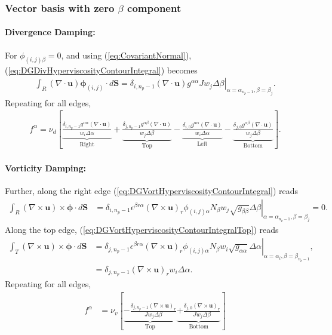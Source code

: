 \documentclass{article}
\newcommand{\vb}{\mathbf}
\newcommand{\vg}{\boldsymbol}
\begin{document}
\subsubsection{Vector basis with zero $\beta$ component}

\paragraph{Divergence Damping:}  For $\phi_{(i,j)\beta} = 0$, and using (\ref{eq:CovariantNormal}), (\ref{eq:DGDivHyperviscosityContourIntegral}) becomes
\begin{align}
\int_R (\nabla \cdot \vb{u}) \vg{\phi}_{(i,j)} \cdot d\vb{S} = \delta_{i,n_p-1} \left. (\nabla \cdot \vb{u}) g^{\alpha \alpha} J w_j \Delta \beta \right\vert_{\alpha = \alpha_{n_p-1}, \beta = \beta_j}.
\end{align}  Repeating for all edges,
\begin{align}
f^\alpha = \nu_d \left[ \underbrace{\frac{\delta_{i,n_p-1} g^{\alpha \alpha} (\nabla \cdot \vb{u})}{w_i \Delta \alpha}}_{\mbox{Right}} + \underbrace{\frac{\delta_{j,n_p-1} g^{\alpha \beta} (\nabla \cdot \vb{u})}{w_j \Delta \beta}}_{\mbox{Top}} - \underbrace{\frac{\delta_{i,0} g^{\alpha \alpha} (\nabla \cdot \vb{u})}{w_i \Delta \alpha}}_{\mbox{Left}} - \underbrace{\frac{\delta_{j,0} g^{\alpha \beta} (\nabla \cdot \vb{u})}{w_j \Delta \beta}}_{\mbox{Bottom}} \right].
\end{align}

\paragraph{Vorticity Damping:}  Further, along the right edge (\ref{eq:DGVortHyperviscosityContourIntegral}) reads
\begin{align}
\int_R (\nabla \times \vb{u}) \times \vg{\phi} \cdot d\vb{S} &= \delta_{i,n_p-1} \left. \epsilon^{\beta r \alpha} (\nabla \times \vb{u})_r \phi_{(i,j) \alpha} N_\beta w_j \sqrt{g_{\beta \beta}} \Delta \beta \right\vert_{\alpha = \alpha_{n_p-1}, \beta = \beta_j} = 0.
\end{align}  Along the top edge, (\ref{eq:DGVortHyperviscosityContourIntegralTop}) reads
\begin{align}
\int_T (\nabla \times \vb{u}) \times \vg{\phi} \cdot d\vb{S} &= \delta_{j,n_p-1} \left. \epsilon^{\beta r \alpha} (\nabla \times \vb{u})_r \phi_{(i,j) \alpha} N_\beta w_i \sqrt{g_{\alpha \alpha}} \Delta \alpha \right\vert_{\alpha = \alpha_i, \beta = \beta_{n_p-1}}, \\
&= \delta_{j,n_p-1} (\nabla \times \vb{u})_r w_i \Delta \alpha.
\end{align}  Repeating for all edges,
\begin{align}
f^\alpha &= \nu_v  \left[\underbrace{- \frac{\delta_{j,n_p-1} (\nabla \times \vb{u})_r}{J w_j \Delta \beta}}_{\mbox{Top}} \underbrace{+ \frac{\delta_{j,0} (\nabla \times \vb{u})_r}{J w_j \Delta \beta}}_{\mbox{Bottom}} \right]
\end{align}
\end{document}
